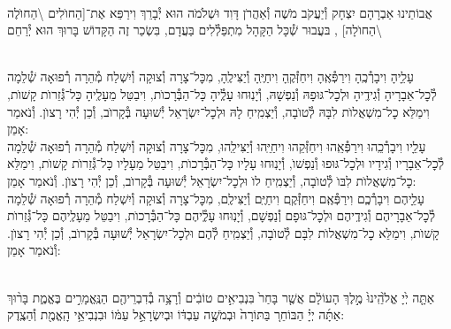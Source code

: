 \documentclass[twoside, openany, parskip=half, 11pt]{book}
\begin{document}
\begin{sometimes}
\\
אֲבוֹתֵינוּ אַבְרָהָם יִצְחָק וְ֯יַעֲקֹב מֹשֶׁה וְ֯אַהֲרֹן דָּוִד וּשְׁלֹמֹה הוּא יְ֯בָרֵךְ וִירַפֵּא אֶת־[הַחוׂלִים \textbackslash הַחוׂלֶה \textbackslash הַחוׂלָה]
,
בּעֲבוּר שְׁ֯כָּל הַקָּהָל מִתְפַּלְ֯לִים בַּעֲדָם, בִּשְׂכַר זֶה
הַקָּדוֹשׁ בָּרוּךְ הוּא יְ֯רַחֵם
\setcolumnwidth{1.4in,1.4in,1.4in}
\begin{paracol}{3}
\\
עָלֵָיהָ וִיבָרְ֯כֶֽהָ וִירַפְּ֯אֶֽהָ וִיחַזְּ֯קֶֽהָ וִיחַיֶּֽהָ וְ֯יַצִּילֶֽהָ, מִכׇּל־צָרָה וְ֯צוּקָה וְ֯יִשְׁלַח מְ֯הֵרָה רְ֯פוּאָה שְׁ֯לֵמָה לְ֯כׇל־אֵבָרָיהָ וְ֯גִידֶֽיהָ וּלְכׇל־גּוּפָהּ וְ֯נַפְשָׁהּ, וְ֯יָנֽוּחוּ עָלְֶ֯יהָ כָּל־הַבְּ֯רָכוׂת, וִיבַטֵּל מֵעָלֶֽיהָ כָּל־גְּ֯זֵרוׂת קָשׁוׂת, וִימַלֵּא כׇל־מִשְׁאֲלוׂת לִבָּהּ לְ֯טוׂבָה, וְ֯יַצְמִֽיחַ לָהּ וּלְכׇל־יִשְׂרָאֵל יְ֯שׁוּעָה בְּ֯קָרוׂב, וְ֯כֵן יְ֯הִי רָצוׂן. וְ֯נֹאמַר אָמֵן:
\switchcolumn
{}\\
עָלֵָיו וִיבָרְ֯כֵֽהוּ וִירַפְּ֯אֵֽהוּ וִיחַזְּ֯קֵהוּ וִיחַיֵּֽהוּ וְ֯יַצִּילֵֽהוּ, מִכׇּל־צָרָה וְ֯צוּקָה וְ֯יִשְׁלַח מְ֯הֵרָה רְ֯פוּאָה שְׁ֯לֵמָה לְ֯כׇל־אֵבָרָיו וְ֯גִידָיו וּלְכׇל־גּוּפוּ וְ֯נַפְשׁוׂ, וְ֯יָנֽוּחוּ עָלָיו כָּל־הַבְּ֯רָכוׂת, וִיבַטֵּל מֵעָלָיו כָּל־גְּ֯זֵרוׂת קָשׁוׂת, וִימַלֵּא כׇל־מִשְׁאֲלוׂת לִבּוׂ לְ֯טוׂבָה, וְ֯יַצְמִֽיחַ לוׂ וּלְכׇל־יִשְׂרָאֵל יְ֯שׁוּעָה בְּ֯קָרוׂב, וְ֯כֵן יְ֯הִי רָצוׂן. וְ֯נֹאמַר אָמֵן:
\switchcolumn
{}\\
עָלֵָיהֶם וִיבָרְ֯כְֶם וִירַפְּ֯אֶֽם וִיחַזְּ֯קֶֽם וִיחַיֶּֽם וְ֯יַצִּילֶֽם, מִכׇּל־צָרָה וְ֯צוּקָה וְ֯יִשְׁלַח מְ֯הֵרָה רְ֯פוּאָה שְׁ֯לֵמָה לְ֯כׇל־אֵבָרָיהֶם וְ֯גִידֶֽיהֶם וּלְכׇל־גּוּפָם וְ֯נַפְשָׁם, וְ֯יָנֽוּחוּ עָלְֶ֯יהֶם כָּל־הַבְּ֯רָכוׂת, וִיבַטֵּל מֵעָלֶֽיהֶם כָּל־גְּ֯זֵרוׂת קָשׁוׂת, וִימַלֵּא כׇל־מִשְׁאֲלוׂת לִבָּם לְ֯טוׂבָה, וְ֯יַצְמִֽיחַ לְ֯הֶם וּלְכׇל־יִשְׂרָאֵל יְ֯שׁוּעָה בְּ֯קָרוׂב, וְ֯כֵן יְ֯הִי רָצוׂן. וְ֯נֹאמַר אָמֵן:
\end{paracol}

\end{sometimes}

\halfkaddish

\hagbaha


\\
אַתָּ֤ה יְ֙יָ אֱלֹ֙הֵֽינוּ֙ מֶ֣לֶךְ הָעוֹלָ֔ם אֲשֶׁ֤ר בָּחַר֙ בִּנְבִיאִ֣ים טוֹבִ֔ים וְ֯רָצָ֥ה בְ֯דִבְרֵיהֶ֖ם הַנֶּֽאֱמָרִ֣ים בֶּאֱמֶ֑ת בָּר֨וּךְ אַתָּ֜ה יְיָ֗ הַבּוֹחֵר֚ בַּתּוֹרָה֙ וּבְמֹשֶׁ֣ה עַבְדּ֔וֹ וּבְיִשְׂרָאֵ֣ל עַמּ֔וֹ וּבִנְבִיאֵ֥י הָֽאֱמֶ֖ת וְ֯הַצֶֽדֶק:
\end{document}
